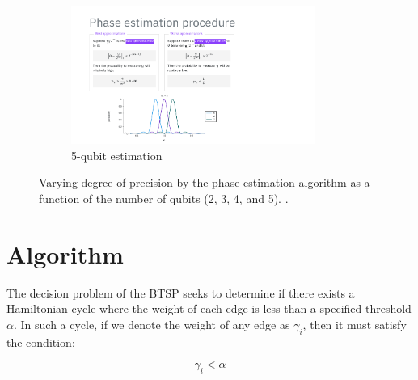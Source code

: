 \documentclass[msc,oneside]{ubcthesis}
\begin{document}
\begin{figure}[ht]
	\vspace{1ex} %
	
	\begin{subfigure}[b]{\linewidth}
		\centering
		\includegraphics[height=4.5cm, trim={2.4cm 0.15cm 6.4cm 5.95cm}, clip]{phase-lecture/29_Phase-estimation-lecture-slides}
		\caption{5-qubit estimation}
		\label{fig:image4}
	\end{subfigure}
	
	\caption{Varying degree of precision by the phase estimation algorithm as a function of the number of qubits (2, 3, 4, and 5). \cite{Phase-estimation}.}
	\label{fig:phase-precision}
\end{figure}
	
	\chapter{Algorithm}
	
The decision problem of the BTSP seeks to determine if there exists a Hamiltonian cycle where the weight of each edge is less than a specified threshold $\alpha$. In such a cycle, if we denote the weight of any edge as $\gamma_i$, then it must satisfy the condition:
	
	\begin{equation}\label{constraint-alpha} 
	 \gamma_i < \alpha
	\end{equation}
	
\end{document}
